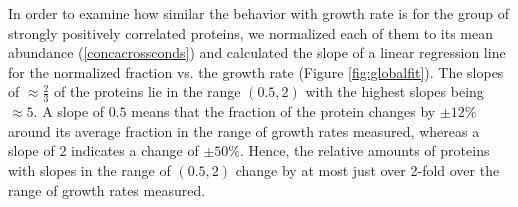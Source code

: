 In order to examine how similar the behavior with growth rate is for the group of strongly positively correlated proteins, we normalized each of them to its mean abundance (\ref{concacrossconds}) and calculated the slope of a linear regression line for the normalized fraction vs. the growth rate (Figure \ref{fig:globalfit}).
The slopes of $\approx \frac{2}{3}$ of the proteins lie in the range $(0.5,2)$ with the highest slopes being $\approx 5$.
A slope of $0.5$ means that the fraction of the protein changes by $\pm12\%$ around its average fraction in the range of growth rates measured, whereas a slope of $2$ indicates a change of $\pm50\%$.
Hence, the relative amounts of proteins with slopes in the range of $(0.5,2)$ change by at most just over 2-fold over the range of growth rates measured.